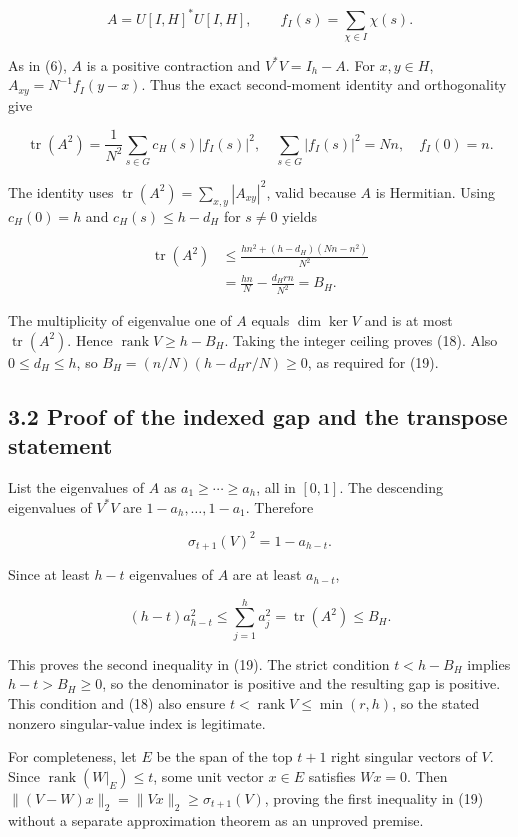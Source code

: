 \documentclass[
  11pt,
  letterpaper,
]{article}
\begin{document}
\[
A=U[I,H]^*U[I,H],\qquad f_I(s)=\sum_{\chi\in I}\chi(s).
\]

As in (6), \(A\) is a positive contraction and \(V^*V=I_h-A\). For
\(x,y\in H\), \(A_{xy}=N^{-1}f_I(y-x)\). Thus the exact second-moment
identity and orthogonality give

\[
\operatorname{tr}(A^2)=\frac1{N^2}\sum_{s\in G}c_H(s)|f_I(s)|^2,
\quad \sum_{s\in G}|f_I(s)|^2=Nn,\quad f_I(0)=n.              \tag{21}
\]

The identity uses \(\operatorname{tr}(A^2)=\sum_{x,y}|A_{xy}|^2\), valid
because \(A\) is Hermitian. Using \(c_H(0)=h\) and \(c_H(s)\leq h-d_H\)
for \(s\neq0\) yields

\[
\begin{aligned}
\operatorname{tr}(A^2)
&\leq\frac{h n^2+(h-d_H)(Nn-n^2)}{N^2}\\
&=\frac{hn}N-\frac{d_Hrn}{N^2}=B_H.                         \end{aligned} \tag{22}
\]

The multiplicity of eigenvalue one of \(A\) equals \(\dim\ker V\) and is
at most \(\operatorname{tr}(A^2)\). Hence
\(\operatorname{rank}V\geq h-B_H\). Taking the integer ceiling proves
(18). Also \(0\leq d_H\leq h\), so \(B_H=(n/N)(h-d_Hr/N)\geq0\), as
required for (19).

\subsection{3.2 Proof of the indexed gap and the transpose
statement}\label{proof-of-the-indexed-gap-and-the-transpose-statement}

List the eigenvalues of \(A\) as \(a_1\geq\cdots\geq a_h\), all in
\([0,1]\). The descending eigenvalues of \(V^*V\) are
\(1-a_h,\ldots,1-a_1\). Therefore

\[
\sigma_{t+1}(V)^2=1-a_{h-t}.
\]

Since at least \(h-t\) eigenvalues of \(A\) are at least \(a_{h-t}\),

\[
(h-t)a_{h-t}^2\leq\sum_{j=1}^h a_j^2
=\operatorname{tr}(A^2)\leq B_H.
\]

This proves the second inequality in (19). The strict condition
\(t<h-B_H\) implies \(h-t>B_H\geq0\), so the denominator is positive and
the resulting gap is positive. This condition and (18) also ensure
\(t<\operatorname{rank}V\leq\min(r,h)\), so the stated nonzero
singular-value index is legitimate.

For completeness, let \(E\) be the span of the top \(t+1\) right
singular vectors of \(V\). Since \(\operatorname{rank}(W|_E)\leq t\),
some unit vector \(x\in E\) satisfies \(Wx=0\). Then
\(\|(V-W)x\|_2=\|Vx\|_2\geq\sigma_{t+1}(V)\), proving the first
inequality in (19) without a separate approximation theorem as an
unproved premise.
\end{document}

